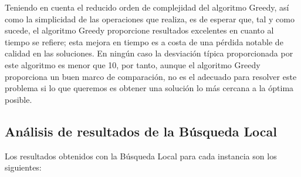 \documentclass[11pt,a4paper]{article}
\begin{document}
	\noindent Teniendo en cuenta el reducido orden de complejidad del algoritmo Greedy, así como la simplicidad de las operaciones que realiza, es de esperar que, tal y como sucede, el algoritmo Greedy proporcione resultados excelentes en cuanto al tiempo se refiere; esta mejora en tiempo es a costa de una pérdida notable de calidad en las soluciones. En ningún caso la desviación típica proporcionada por este algoritmo es menor que 10, por tanto, aunque el algoritmo Greedy proporciona un buen marco de comparación, no es el adecuado para resolver este problema si lo que queremos es obtener una solución lo más cercana a la óptima posible. 
	
	\FloatBarrier
	\subsection{Análisis de resultados de la Búsqueda Local}
	
	\noindent Los resultados obtenidos con la Búsqueda Local para cada instancia son los siguientes:\\
\end{document}
